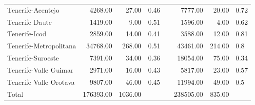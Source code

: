 \begin{table}[ht]
\begin{tabular}{lrrllrrl}
  Tenerife-Acentejo  & 4268.00 & 27.00 & 0.46 &  & 7777.00 & 20.00 & 0.72 \\ 
  Tenerife-Daute & 1419.00 & 9.00 & 0.51 &  & 1596.00 & 4.00 & 0.62 \\ 
  Tenerife-Icod & 2859.00 & 14.00 & 0.41 &  & 3588.00 & 12.00 & 0.81 \\ 
  Tenerife-Metropolitana  & 34768.00 & 268.00 & 0.51 &  & 43461.00 & 214.00 & 0.8 \\ 
  Tenerife-Suroeste  & 7391.00 & 34.00 & 0.36 &  & 18054.00 & 75.00 & 0.34 \\ 
  Tenerife-Valle Guimar  & 2971.00 & 16.00 & 0.43 &  & 5817.00 & 23.00 & 0.57 \\ 
  Tenerife-Valle Orotava  & 9807.00 & 46.00 & 0.45 &  & 11994.00 & 49.00 & 0.5 \\ 
  Total & 176393.00 & 1036.00 &  &  & 238505.00 & 835.00 &  \\ 
   \hline
\end{tabular}
\end{table}
